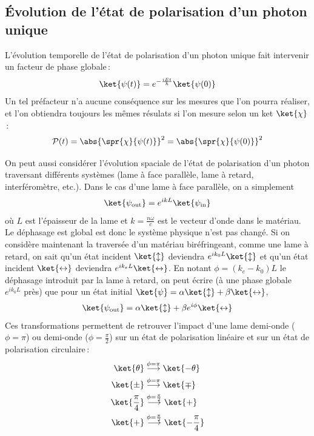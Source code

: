         \subsection{Évolution de l’état de polarisation d’un photon unique}

        L’évolution temporelle de l’état de polarisation d’un photon unique fait intervenir un facteur de phase globale :
        \[ \ket{\psi(t)} = e^{-\frac{iEt}{\hbar}} \ket{\psi(0)} \]   
        Un tel préfacteur n’a aucune conséquence sur les mesures que l’on pourra réaliser, et l’on obtiendra toujours les mêmes résulats si l’on mesure selon un ket $\ket{\chi}$ :
        \[ \mathcal{P}(t) = \abs{\spr{\chi}{\psi(t)}}^2 = \abs{\spr{\chi}{\psi(0)}}^2 \]   

        On peut aussi considérer l’évolution spaciale de l’état de polarisation d’un photon traversant différents systèmes (lame à face parallèle, lame à retard, interféromètre, etc.). Dans le cas d’une lame à face parallèle, on a simplement 
        \[ \ket{\psi_{\text{out}}} = e^{i k L} \ket{\psi_{\text{in}}} \]   
        où $L$ est l’épaisseur de la lame et $k = \frac{n\omega}{c}$ est le vecteur d’onde dans le matériau. Le déphasage est global est donc le système physique n’est pas changé. Si on considère maintenant la traversée d’un matériau biréfringeant, comme une lame à retard, on sait qu’un état incident $\ket{\updownarrow}$ deviendra $e^{i k_0 L} \ket{\updownarrow}$ et qu’un état incident $\ket{\leftrightarrow}$ deviendra $e^{i k_e L} \ket{\leftrightarrow}$. En notant $\phi = (k_e - k_0) L$ le déphasage introduit par la lame à retard, on peut écrire (à une phase globale $e^{i k_0 L}$ près) que pour un état initial $\ket{\psi} = \alpha \ket{\updownarrow} + \beta \ket{\leftrightarrow}$, 
        \[ \ket{\psi_{\text{out}}} = \alpha \ket{\updownarrow} + \beta e^{i \phi} \ket{\leftrightarrow} \]  
        Ces transformations permettent de retrouver l’impact d’une lame demi-onde ($\phi = \pi$) ou demi-onde ($\phi = \frac{\pi}{2}$) sur un état de polarisation linéaire et sur un état de polarisation circulaire :
        \begin{align*}
            \ket{\theta} &\overset{\phi = \pi}{\longrightarrow} \ket{-\theta} \\
            \ket{\pm} &\overset{\phi = \pi}{\longrightarrow} \ket{\mp} \\
            \ket{\frac{\pi}{4}} &\overset{\phi = \frac{\pi}{2}}{\longrightarrow} \ket{+} \\
            \ket{+} &\overset{\phi = \frac{\pi}{2}}{\longrightarrow} \ket{- \frac{\pi}{4}}
        \end{align*}
        


